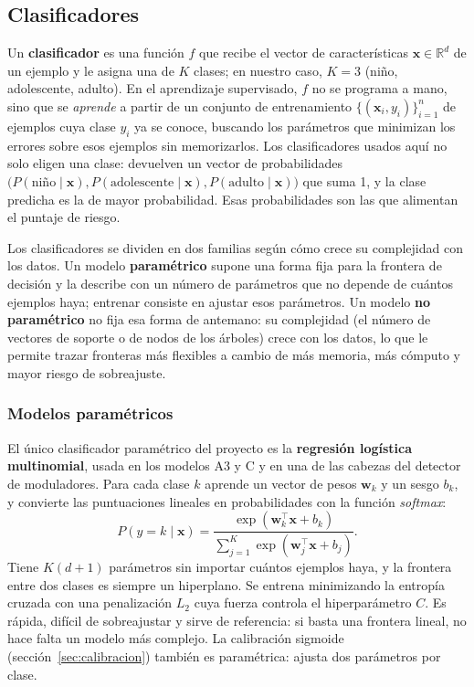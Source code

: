\documentclass[11pt,a4paper]{article}
\begin{document}
\subsection{Clasificadores}
\label{sec:clasificadores}

Un \textbf{clasificador} es una función $f$ que recibe el vector de características $\mathbf{x} \in \mathbb{R}^d$ de un ejemplo y le asigna una de $K$ clases; en nuestro caso, $K = 3$ (niño, adolescente, adulto). En el aprendizaje supervisado, $f$ no se programa a mano, sino que se \emph{aprende} a partir de un conjunto de entrenamiento $\{(\mathbf{x}_i, y_i)\}_{i=1}^{n}$ de ejemplos cuya clase $y_i$ ya se conoce, buscando los parámetros que minimizan los errores sobre esos ejemplos sin memorizarlos. Los clasificadores usados aquí no solo eligen una clase: devuelven un vector de probabilidades $\big(P(\text{niño} \mid \mathbf{x}), P(\text{adolescente} \mid \mathbf{x}), P(\text{adulto} \mid \mathbf{x})\big)$ que suma 1, y la clase predicha es la de mayor probabilidad. Esas probabilidades son las que alimentan el puntaje de riesgo.

Los clasificadores se dividen en dos familias según cómo crece su complejidad con los datos. Un modelo \textbf{paramétrico} supone una forma fija para la frontera de decisión y la describe con un número de parámetros que no depende de cuántos ejemplos haya; entrenar consiste en ajustar esos parámetros. Un modelo \textbf{no paramétrico} no fija esa forma de antemano: su complejidad (el número de vectores de soporte o de nodos de los árboles) crece con los datos, lo que le permite trazar fronteras más flexibles a cambio de más memoria, más cómputo y mayor riesgo de sobreajuste.

\subsubsection{Modelos paramétricos}

El único clasificador paramétrico del proyecto es la \textbf{regresión logística multinomial}, usada en los modelos A3 y C y en una de las cabezas del detector de moduladores. Para cada clase $k$ aprende un vector de pesos $\mathbf{w}_k$ y un sesgo $b_k$, y convierte las puntuaciones lineales en probabilidades con la función \emph{softmax}:
\begin{equation}
  P(y = k \mid \mathbf{x}) = \frac{\exp(\mathbf{w}_k^{\top}\mathbf{x} + b_k)}{\sum_{j=1}^{K} \exp(\mathbf{w}_j^{\top}\mathbf{x} + b_j)}.
\end{equation}
Tiene $K(d+1)$ parámetros sin importar cuántos ejemplos haya, y la frontera entre dos clases es siempre un hiperplano. Se entrena minimizando la entropía cruzada con una penalización $L_2$ cuya fuerza controla el hiperparámetro $C$. Es rápida, difícil de sobreajustar y sirve de referencia: si basta una frontera lineal, no hace falta un modelo más complejo. La calibración sigmoide (sección~\ref{sec:calibracion}) también es paramétrica: ajusta dos parámetros por clase.
\end{document}
